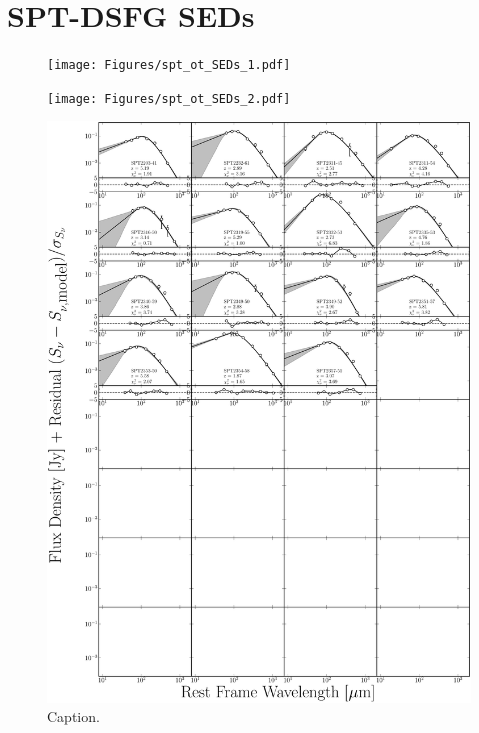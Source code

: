 \chapter{SPT-DSFG SEDs}

\begin{figure}
	\centering
	\texttt{[image: Figures/spt\_ot\_SEDs\_1.pdf]}
\end{figure}
\begin{figure}
	\centering
	\texttt{[image: Figures/spt\_ot\_SEDs\_2.pdf]}
\end{figure}
\begin{figure}
	\centering
	\includegraphics[width=\columnwidth]{Figures/spt_ot_SEDs_3.pdf}
	\caption{Caption.}
\end{figure}


